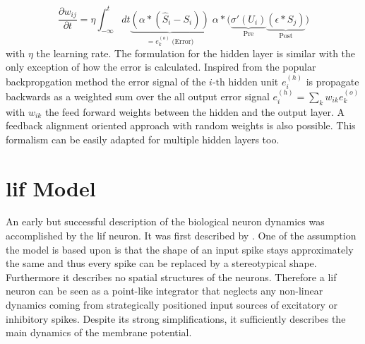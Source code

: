 \begin{equation}
\frac{\partial w_{ij}}{\partial t} = \eta \int_{-\infty}^{t} dt
\underbrace{\left(\alpha \ast (\hat{S}_i - S_i)\right)}_{= e^{(o)}_k \; \text{(Error)}} 
\; \alpha \ast 
\Big(\underbrace{\sigma'(U_i)}_{\text{Pre}} 
\underbrace{\left(\epsilon \ast S_j\right)}_{\text{Post}}\Big)
\end{equation}
with $\eta$ the learning rate. The formulation for the hidden layer is similar with the only exception of how the error is calculated. Inspired from the popular backpropgation method the error signal of the $i \text{-th}$ hidden unit $e^{(h)}_i$ is propagate backwards as a weighted sum over the all output error signal $e^{(h)}_i = \sum_{k} w_{ik} e^{(o)}_k$ with $w_{ik}$ the feed forward weights between the hidden and the output layer. A feedback alignment oriented approach with random weights is also possible. This formalism can be easily adapted for multiple hidden layers too.


%



\section{\gls{lif} Model}

An early but successful description of the biological neuron dynamics was accomplished by the \gls{lif} neuron. It was first described by \cite{lapicque1907recherches}. One of the assumption the model is based upon is that the shape of an input spike stays approximately the same and thus every spike can be replaced by a stereotypical shape. Furthermore it describes no spatial structures of the neurons. Therefore a \gls{lif} neuron can be seen as a point-like integrator that neglects any non-linear dynamics coming from strategically positioned input sources of excitatory or inhibitory spikes. Despite its strong simplifications, it sufficiently describes the main dynamics of the membrane potential. 


